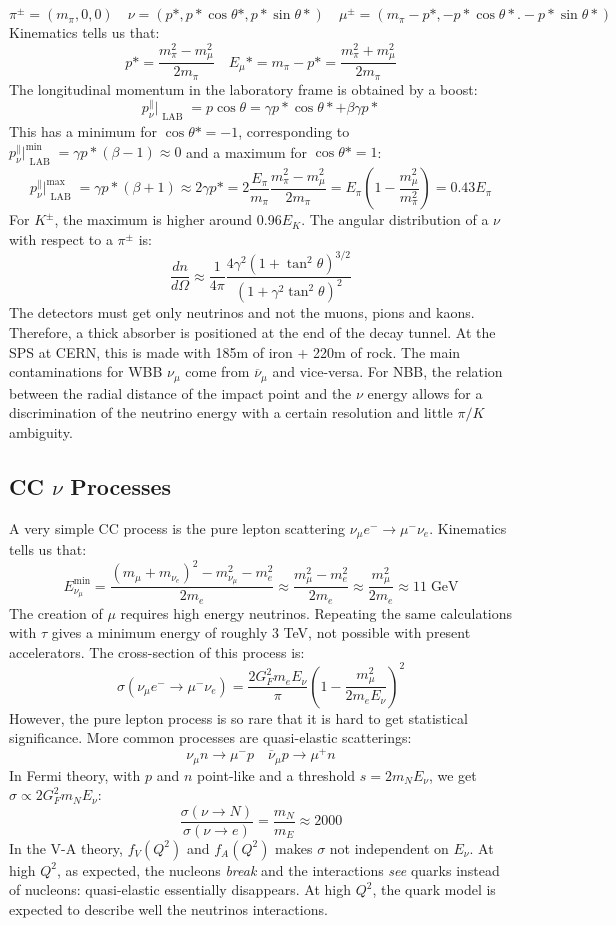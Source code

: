 \documentclass[10.75pt,a4paper,openright,bottom=2cm]{article}
\begin{document}
\[
\pi^\pm=(m_\pi,0,0) \quad \nu=(p*,p*\cos\theta*, p*\sin\theta*) \quad \mu^\pm=(m_\pi-p*,-p*\cos\theta*.-p*\sin\theta*)
\]
Kinematics tells us that:
\[
p*=\frac{m_\pi^2-m_\mu^2}{2m_\pi} \quad E_\mu*=m_\pi-p*=\frac{m_\pi^2+m_\mu^2}{2m_\pi}
\]
The longitudinal momentum in the laboratory frame is obtained by a boost:
\[
p_\nu^\parallel\bigr|_{\substack{\text{LAB}}}=p\cos\theta=\gamma p*\cos\theta*+\beta\gamma p*
\]
This has a minimum for $\cos\theta*=-1$, corresponding to $p_\nu^\parallel\bigr|^{{\min}}_{\substack{\text{LAB}}}=\gamma p*(\beta-1)\approx0$ and a maximum for $\cos\theta*=1$:
\[
p_\nu^\parallel\bigr|^{{\max}}_{\substack{\text{LAB}}}=\gamma p*(\beta+1)\approx2\gamma p*=2\frac{E_\pi}{m_\pi}\frac{m_\pi^2-m_\mu^2}{2m_\pi}=E_\pi\left(1-\frac{m_\mu^2}{m_\pi^2}\right)=0.43E_\pi
\]
For $K^\pm$, the maximum is higher around 0.96$E_K$. The angular distribution of a $\nu$ with respect to a $\pi^\pm$ is:
\[
\frac{dn}{d\Omega}\approx\frac{1}{4\pi}\frac{4\gamma^2(1+\tan^2\theta)^{3/2}}{(1+\gamma^2\tan^2\theta)^2}
\]
The detectors must get only neutrinos and not the muons, pions and kaons. Therefore, a thick absorber is positioned at the end of the decay tunnel. At the SPS at CERN, this is made with 185m of iron + 220m of rock. The main contaminations for WBB $\nu_\mu$ come from $\overline{\nu}_\mu$ and vice-versa. For NBB, the relation between the radial distance of the impact point and the $\nu$ energy allows for a discrimination of the neutrino energy with a certain resolution and little $\pi/K$ ambiguity.
\subsection{CC $\nu$ Processes}
A very simple CC process is the pure lepton scattering $\nu_\mu e^-\to\mu^-\nu_e$. Kinematics tells us that:
\[
E_{\nu_\mu}^{\min}=\frac{(m_\mu+m_{\nu_e})^2-m_{\nu_\mu}^2-m_e^2}{2m_e}\approx\frac{m_\mu^2-m_e^2}{2m_e}\approx\frac{m_\mu^2}{2m_e}\approx11\;\text{GeV}
\]
The creation of $\mu$ requires high energy neutrinos. Repeating the same calculations with $\tau$ gives a minimum energy of roughly 3 TeV, not possible with present accelerators. The cross-section of this process is:
\[
\sigma(\nu_\mu e^-\to\mu^-\nu_e)=\frac{2G_F^2m_eE_\nu}{\pi}\left(1-\frac{m_\mu^2}{2m_eE_\nu}\right)^2
\]
However, the pure lepton process is so rare that it is hard to get statistical significance. More common processes are quasi-elastic scatterings:
\[
\nu_\mu n\to\mu^-p \quad \overline{\nu}_\mu p\to\mu^+n
\]
In Fermi theory, with $p$ and $n$ point-like and a threshold $s=2m_NE_\nu$, we get $\sigma\propto2G_F^2m_NE_\nu$:
\[
\frac{\sigma(\nu\to N)}{\sigma(\nu\to e)}=\frac{m_N}{m_E}\approx2000
\]
In the V-A theory, $f_V(Q^2)$ and $f_A(Q^2)$ makes $\sigma$ not independent on $E_\nu$. At high $Q^2$, as expected, the nucleons \textit{break} and the interactions \textit{see} quarks instead of nucleons: quasi-elastic essentially disappears. At high $Q^2$, the quark model is expected to describe well the neutrinos interactions. 
\end{document}
